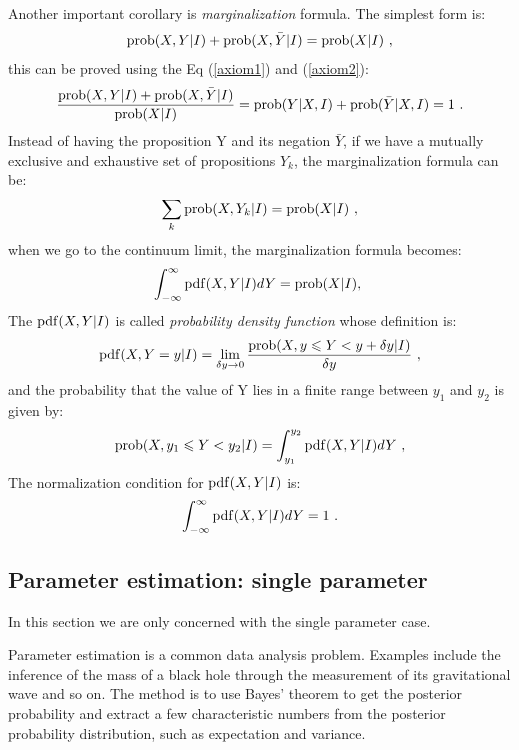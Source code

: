 \documentclass[11pt, a4paper]{article}
\begin{document}
Another important corollary is {\em marginalization} formula. The simplest form is:
\begin{equation}
{\rm prob}(X,Y|I)+{\rm prob}(X,\bar Y|I)={\rm prob}(X|I)~,
\end{equation}
this can be proved using the Eq (\ref{axiom1}) and (\ref{axiom2}):
\begin{equation}
\frac{{\rm prob}(X,Y|I)+{\rm prob}(X,\bar Y|I)}{{\rm prob}(X|I)}={\rm prob}(Y|X,I)+{\rm prob}(\bar Y|X,I)=1~.
\end{equation}
Instead of having the proposition Y and its negation ${\bar Y}$, if we have a mutually exclusive and exhaustive set of propositions ${Y_k}$, the marginalization formula can be:
\begin{equation}
\sum_k {\rm prob}(X,Y_k|I)={\rm prob}(X|I)~,
\end{equation}
when we go to the continuum limit, the marginalization formula becomes:
\begin{equation}
\int_{-\infty}^{\infty} {\rm pdf}(X,Y|I)dY={\rm prob}(X|I),~
\end{equation}
The ${\rm pdf}(X,Y|I)$ is called {\em probability density function} whose definition is:
\begin{equation}
{\rm pdf}(X,Y=y|I)=\lim_{\delta y \to 0} \frac {{\rm prob}(X,y \leqslant Y<y+\delta y|I)}{\delta y}~,
\end{equation}
and the probability that the value of Y lies in a finite range between $y_1$ and $y_2$ is given by:
\begin{equation}
{\rm prob}(X,y_1 \leqslant Y<y_2|I)=\int_{y_1}^{y_2}{\rm pdf}(X,Y|I)dY~,
\end{equation}
The normalization condition for ${\rm pdf}(X,Y|I)$ is:
\begin{equation}
\int_{- \infty}^{\infty}{\rm pdf}(X,Y|I)dY=1~.
\end{equation}

\subsection{Parameter estimation: single parameter}
\quad

In this section we are only concerned with the single parameter case.

Parameter estimation is a common data analysis problem. Examples include the inference of the mass of a black hole through the measurement of its gravitational wave and so on. The method is to use Bayes' theorem to get the posterior probability and extract a few characteristic numbers from the posterior probability distribution, such as expectation and variance.
\end{document}
